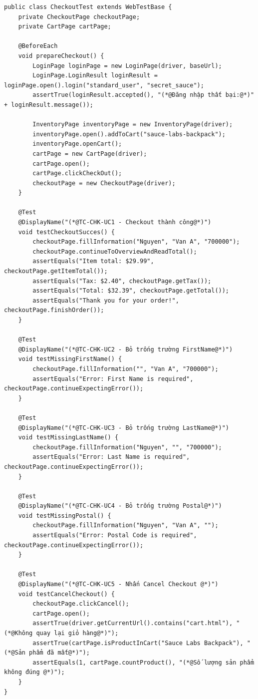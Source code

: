 \documentclass[a4paper]{article}
\begin{document}
\begin{lstlisting}[caption={Trích đoạn mã nguồn lớp CheckoutTest.java}]
public class CheckoutTest extends WebTestBase {
    private CheckoutPage checkoutPage;
    private CartPage cartPage;

    @BeforeEach
    void prepareCheckout() {
        LoginPage loginPage = new LoginPage(driver, baseUrl);
        LoginPage.LoginResult loginResult = loginPage.open().login("standard_user", "secret_sauce");
        assertTrue(loginResult.accepted(), "(*@Đăng nhập thất bại:@*)" + loginResult.message());

        InventoryPage inventoryPage = new InventoryPage(driver);
        inventoryPage.open().addToCart("sauce-labs-backpack");
        inventoryPage.openCart();
        cartPage = new CartPage(driver);
        cartPage.open();
        cartPage.clickCheckOut();
        checkoutPage = new CheckoutPage(driver);
    }

    @Test
    @DisplayName("(*@TC-CHK-UC1 - Checkout thành công@*)")
    void testCheckoutSucces() {
        checkoutPage.fillInformation("Nguyen", "Van A", "700000");
        checkoutPage.continueToOverviewAndReadTotal();
        assertEquals("Item total: $29.99", checkoutPage.getItemTotal());
        assertEquals("Tax: $2.40", checkoutPage.getTax());
        assertEquals("Total: $32.39", checkoutPage.getTotal());
        assertEquals("Thank you for your order!", checkoutPage.finishOrder());
    }

    @Test
    @DisplayName("(*@TC-CHK-UC2 - Bỏ trống trường FirstName@*)")
    void testMissingFirstName() {
        checkoutPage.fillInformation("", "Van A", "700000");
        assertEquals("Error: First Name is required", checkoutPage.continueExpectingError());
    }

    @Test
    @DisplayName("(*@TC-CHK-UC3 - Bỏ trống trường LastName@*)")
    void testMissingLastName() {
        checkoutPage.fillInformation("Nguyen", "", "700000");
        assertEquals("Error: Last Name is required", checkoutPage.continueExpectingError());
    }

    @Test
    @DisplayName("(*@TC-CHK-UC4 - Bỏ trống trường Postal@*)")
    void testMissingPostal() {
        checkoutPage.fillInformation("Nguyen", "Van A", "");
        assertEquals("Error: Postal Code is required", checkoutPage.continueExpectingError());
    }

    @Test
    @DisplayName("(*@TC-CHK-UC5 - Nhấn Cancel Checkout @*)")
    void testCancelCheckout() {
        checkoutPage.clickCancel();
        cartPage.open();
        assertTrue(driver.getCurrentUrl().contains("cart.html"), "(*@Không quay lại giỏ hàng@*)");
        assertTrue(cartPage.isProductInCart("Sauce Labs Backpack"), "(*@Sản phẩm đã mất@*)");
        assertEquals(1, cartPage.countProduct(), "(*@Số lượng sản phẩm không đúng @*)");
    }
}
\end{lstlisting}
\end{document}
